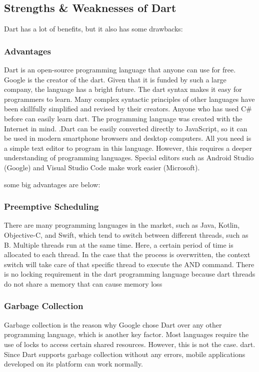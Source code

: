 \subsection{Strengths \& Weaknesses of Dart}
Dart has a lot of benefits, but it also has some drawbacks:
\subsubsection{Advantages}
Dart is an open-source programming language that anyone can use for free. Google is the creator of the dart. Given that it is funded by such a large company, the language has a bright future. The dart syntax makes it easy for programmers to learn. Many complex syntactic principles of other languages have been skillfully simplified and revised by their creators. Anyone who has used C\# before can easily learn dart. The programming language was created with the Internet in mind. .Dart can be easily converted directly to JavaScript, so it can be used in modern smartphone browsers and desktop computers. All you need is a simple text editor to program in this language. However, this requires a deeper understanding of programming languages. Special editors such as Android Studio (Google) and Visual Studio Code make work easier (Microsoft).

some big advantages are below:
\subsubsection{Preemptive Scheduling}
There are many programming languages in the market, such as Java, Kotlin, Objective-C, and Swift, which tend to switch between different threads, such as B. Multiple threads run at the same time. Here, a certain period of time is allocated to each thread. In the case that the process is overwritten, the context switch will take care of that specific thread to execute the AND command. There is no locking requirement in the dart programming language because dart threads do not share a memory that can cause memory loss
\subsubsection{Garbage Collection}
Garbage collection is the reason why Google chose Dart over any other programming language, which is another key factor. Most languages require the use of locks to access certain shared resources. However, this is not the case. dart. Since Dart supports garbage collection without any errors, mobile applications developed on its platform can work normally.
